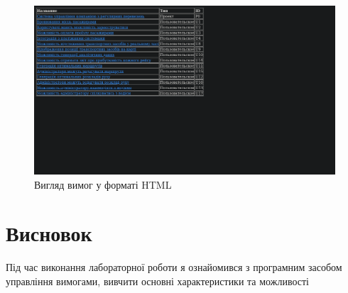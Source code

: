 \documentclass[14pt]{extreport}
\begin{document}
\begin{normalsize}
\begin{figure}[H]
	\centering
	\includegraphics[scale=0.35]{5}
	\caption{Вигляд вимог у форматі HTML}
\end{figure}
	\section*{Висновок}
	Під час виконання лабораторної роботи я ознайомився з програмним засобом управління вимогами, вивчити основні характеристики та можливості
	
\end{normalsize}
\end{document}
